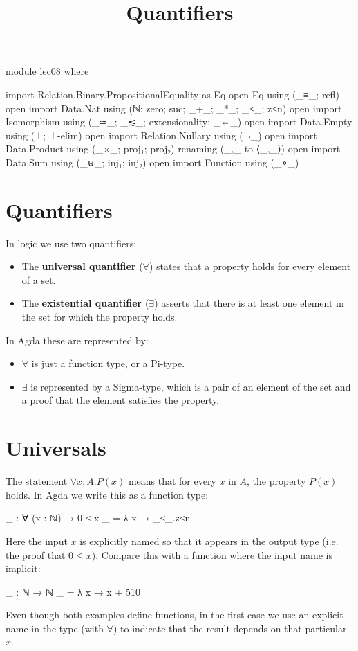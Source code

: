 \documentclass{lecturenotes}
\title{Quantifiers}
\begin{document}
\maketitle

\begin{code}
module lec08 where

import Relation.Binary.PropositionalEquality as Eq
open Eq using (_≡_; refl)
open import Data.Nat using (ℕ; zero; suc; _+_; _*_; _≤_; z≤n)
open import Isomorphism using (_≃_; _≲_; extensionality; _⇔_)
open import Data.Empty using (⊥; ⊥-elim)
open import Relation.Nullary using (¬_)
open import Data.Product using (_×_; proj₁; proj₂) renaming (_,_ to ⟨_,_⟩)
open import Data.Sum using (_⊎_; inj₁; inj₂)
open import Function using (_∘_)
\end{code}

\section{Quantifiers}
\label{sec:quantifiers}

In logic we use two quantifiers:
\begin{itemize}
  \item The \textbf{universal quantifier} ($\forall$) states that a property holds for every element of a set.
  \item The \textbf{existential quantifier} ($\exists$) asserts that there is at least one element in the set for which the property holds.
\end{itemize}
In Agda these are represented by:
\begin{itemize}
  \item $\forall$ is just a function type, or a Pi-type.
  \item $\exists$ is represented by a Sigma-type, which is a pair of an element of the set and a proof that the element satisfies the property.
\end{itemize}

\section{Universals}
\label{sec:universals}

The statement $\forall x : A.P(x)$ means that for every $x$ in $A$, the property $P(x)$ holds. In Agda we write this as a function type:
\begin{code}
_ : ∀ (x : ℕ) → 0 ≤ x
_ = λ x → _≤_.z≤n
\end{code}
Here the input $x$ is explicitly named so that it appears in the output type (i.e. the proof that $0 ≤ x$). Compare this with a function where the input name is implicit:
\begin{code}
_ : ℕ → ℕ
_ = λ x → x + 510
\end{code}
Even though both examples define functions, in the first case we use an explicit name in the type (with $\forall$) to indicate that the result depends on that particular $x$.
\end{document}
